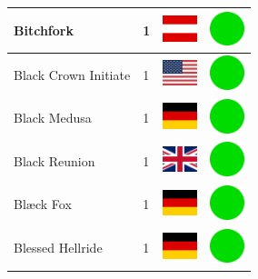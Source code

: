 \documentclass[12pt, a4paper, twoside]{report}
\begin{document}
\begin{center}
\begin{longtable}{|p{5cm}|p{2cm}|p{2cm}|p{2cm}|}
			Bitchfork & 1 & \includegraphics[width=1cm]{4x3/at} & \includegraphics[width=1cm]{likes/y} \\ \hline
			Black Crown Initiate & 1 & \includegraphics[width=1cm]{4x3/us} & \includegraphics[width=1cm]{likes/y} \\ \hline
			Black Medusa & 1 & \includegraphics[width=1cm]{4x3/de} & \includegraphics[width=1cm]{likes/y} \\ \hline
			Black Reunion & 1 & \includegraphics[width=1cm]{4x3/gb} & \includegraphics[width=1cm]{likes/y} \\ \hline
			Blæck Fox & 1 & \includegraphics[width=1cm]{4x3/de} & \includegraphics[width=1cm]{likes/y} \\ \hline
			Blessed Hellride & 1 & \includegraphics[width=1cm]{4x3/de} & \includegraphics[width=1cm]{likes/y} \\ \hline

\end{longtable}
\end{center}
\end{document}

